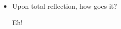 \documentclass[12pt]{article}
\renewcommand{\,}{\textsuperscript{,}}
\begin{document}
\begin{itemize}
\begin{itemize}
Better abt. calling

\item How goes setup of new home?

Nope

\item Upon reflection, how go practical matters?

eh

\end{itemize}  
 \item Upon total reflection, how goes it?

Eh!  
\end{itemize}  
   
\end{document}
